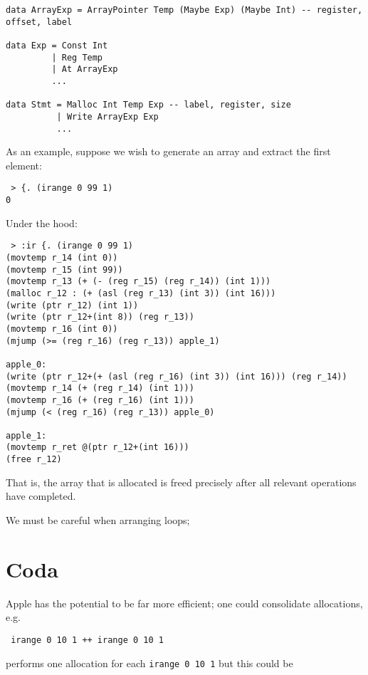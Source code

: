 \documentclass{article}
\begin{document}
\begin{verbatim}
data ArrayExp = ArrayPointer Temp (Maybe Exp) (Maybe Int) -- register, offset, label

data Exp = Const Int
         | Reg Temp
         | At ArrayExp
         ...

data Stmt = Malloc Int Temp Exp -- label, register, size
          | Write ArrayExp Exp
          ...
\end{verbatim}

As an example, suppose we wish to generate an array and extract the first element:

\begin{verbatim}
 > {. (irange 0 99 1)
0
\end{verbatim}

Under the hood:

\begin{verbatim}
 > :ir {. (irange 0 99 1)
(movtemp r_14 (int 0))
(movtemp r_15 (int 99))
(movtemp r_13 (+ (- (reg r_15) (reg r_14)) (int 1)))
(malloc r_12 : (+ (asl (reg r_13) (int 3)) (int 16)))
(write (ptr r_12) (int 1))
(write (ptr r_12+(int 8)) (reg r_13))
(movtemp r_16 (int 0))
(mjump (>= (reg r_16) (reg r_13)) apple_1)

apple_0:
(write (ptr r_12+(+ (asl (reg r_16) (int 3)) (int 16))) (reg r_14))
(movtemp r_14 (+ (reg r_14) (int 1)))
(movtemp r_16 (+ (reg r_16) (int 1)))
(mjump (< (reg r_16) (reg r_13)) apple_0)

apple_1:
(movtemp r_ret @(ptr r_12+(int 16)))
(free r_12)
\end{verbatim}

That is, the array that is allocated is freed precisely after all relevant operations have completed.

We must be careful when arranging loops;


\section{Coda}

Apple has the potential to be far more efficient; one could consolidate allocations, e.g.

\begin{verbatim}
 irange 0 10 1 ++ irange 0 10 1
\end{verbatim}

performs one allocation for each {\tt irange 0 10 1} but this could be
\end{document}
